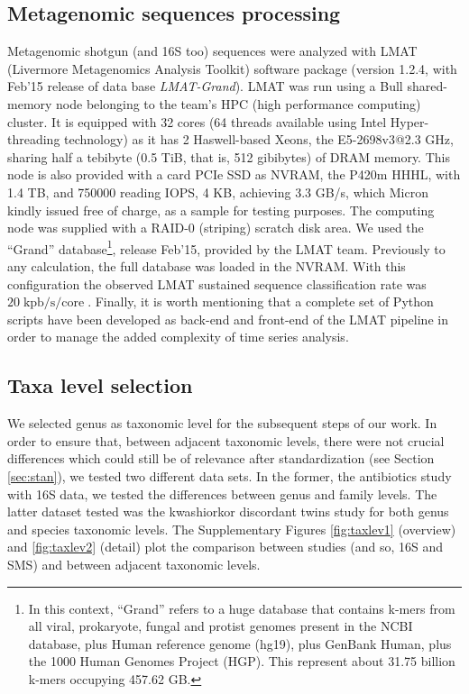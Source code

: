 \documentclass[12pt]{article}
\newcommand{\un}[1]{\operatorname{#1}}
\newcommand{\unclassrate}[0]{\un{kpb/s/core}}
\begin{document}
\subsection{Metagenomic sequences processing}
Metagenomic shotgun (and 16S too) sequences were analyzed with LMAT (Livermore Metagenomics Analysis Toolkit) software package\cite{LMAT} (version 1.2.4, with Feb'15 release of data base \emph{LMAT-Grand}). LMAT was run using a Bull shared-memory node belonging to the team's HPC (high performance computing) cluster. It is equipped with 32 cores (64 threads available using Intel Hyper-threading technology) as it has 2 Haswell-based Xeons, the E5-2698v3@2.3 GHz, sharing half a tebibyte (0.5 TiB, that is, 512 gibibytes) of DRAM memory. This node is also provided with a card PCIe SSD as NVRAM, the P420m HHHL, with 1.4 TB, and 750000 reading IOPS, 4 KB, achieving 3.3 GB/s, which Micron kindly issued free of charge, as a sample for testing purposes. The computing node was supplied with a RAID-0 (striping) scratch disk area. We used the ``Grand'' database\footnote{In this context, ``Grand'' refers to a huge database that contains k-mers from all viral, prokaryote, fungal and protist genomes present in the NCBI database, plus Human reference genome (hg19), plus GenBank Human, plus the 1000 Human Genomes Project (HGP). This represent about 31.75 billion k-mers occupying 457.62 GB.}, release Feb'15, provided by the LMAT team. Previously to any calculation, the full database was loaded in the NVRAM. With this configuration the observed LMAT sustained sequence classification rate was $20\unclassrate$. Finally, it is worth mentioning that a complete set of Python scripts have been developed as back-end and front-end of the LMAT pipeline in order to manage the added complexity of time series analysis. 

\subsection{Taxa level selection}
We selected genus as taxonomic level for the subsequent steps of our work. In order to ensure that, between adjacent taxonomic levels, there were not crucial differences which could still be of relevance after standardization (see Section \ref{sec:stan}), we tested two different data sets. In the former, the antibiotics study\cite{antibiotic} with 16S data, we tested the differences between genus and family levels. The latter dataset tested was the kwashiorkor discordant twins study\cite{kwashiorkor} for both genus and species taxonomic levels. The Supplementary Figures \ref{fig:taxlev1} (overview) and \ref{fig:taxlev2} (detail) plot the comparison between studies (and so, 16S and SMS) and between adjacent taxonomic levels.
\end{document}
